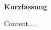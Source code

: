 \thispagestyle{plain}
\begin{flushleft}
    \Huge
    \textbf{Kurzfassung}
\end{flushleft}
\vspace{1cm}
Content.....